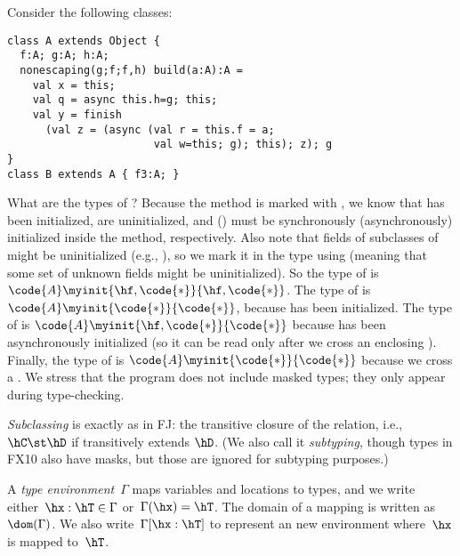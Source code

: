 Consider the following classes:
\begin{lstlisting}
class A extends Object {
  f:A; g:A; h:A;
  nonescaping(g;f;f,h) build(a:A):A =
    val x = this;
    val q = async this.h=g; this;
    val y = finish
      (val z = (async (val r = this.f = a;
                       val w=this; g); this); z); g
}
class B extends A { f3:A; }
\end{lstlisting}
What are the types of ?
Because the method is marked with , %
    we know that  has been initialized,
     are uninitialized,
    and
     () must be synchronously (asynchronously) initialized inside the method, respectively.
Also note that fields of subclasses of  might be uninitialized (e.g., ),
    so we mark it in the type using \code{*} (meaning that some set of unknown fields might be uninitialized).
So the type of  is %
    $\code{A}\myinit{\hf,\code{*}}{\hf,\code{*}}$.
The type of  is
    $\code{A}\myinit{\code{*}}{\code{*}}$,
    because  has been initialized.
The type of  is
    $\code{A}\myinit{\hf,\code{*}}{\code{*}}$
    because  has been asynchronously initialized
    (so it can be read only after we cross an enclosing \finish).
Finally,
    the type of  is
    $\code{A}\myinit{\code{*}}{\code{*}}$
    because we cross a \finish.
We stress that the program does not include masked types;
    they only appear during type-checking.




\emph{Subclassing} is exactly as in FJ:
    the transitive closure of the \hextends relation,
    i.e., $\hC \st \hD$ if \hC transitively extends $\hD$.
(We also call it \emph{subtyping}, though types in FX10 also have masks,
    but those are ignored for subtyping purposes.)

A \emph{type environment}~$\Gamma$ maps variables and locations to types,
    and we write either~$\hx:\hT \in \Gamma$ or~$\Gamma(\hx)=\hT$.
The domain of a mapping is written as~$\dom(\Gamma)$.
We also write~$\Gamma[\hx:\hT]$ to represent an new environment where~$\hx$ is mapped to~$\hT$.

